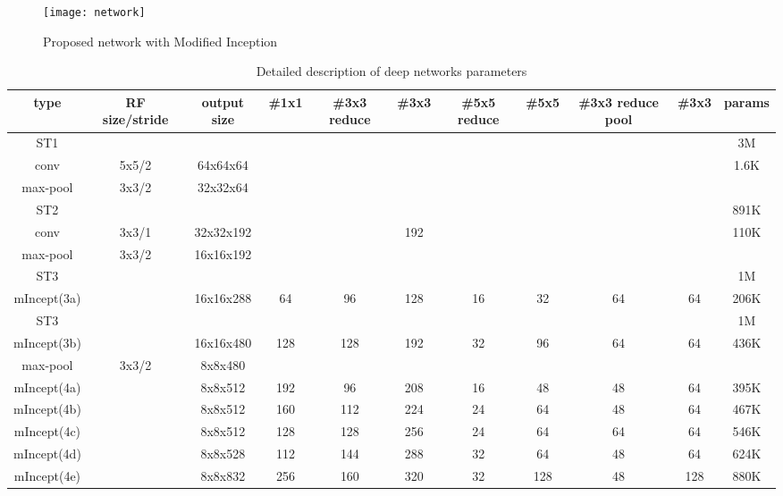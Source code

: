 \documentclass[conference]{IEEEtran}
\begin{document}
\begin{figure*}
  \centering
      \texttt{[image: network]}
\caption{Proposed network with Modified Inception}
\label{fig:network}
\end{figure*}












\begin{table*}[t]
\caption{Detailed description of deep networks parameters}
\label{tab:network}
  \centering
  \begin{tabular}{|c|c|c|c|c|c|c|c|c|c|c|}
\hline
 type & RF size/stride & output size & \#1x1 & \#3x3 reduce & \#3x3 & \#5x5 reduce & \#5x5 & \#3x3 reduce pool & \#3x3 & params \\
 \hline
 \hline
 ST1 & & & & & & & & & & 3M \\
 \hline
 conv & 5x5/2 &64x64x64 &  &   &   &   &   &  & & 1.6K \\
 \hline
 max-pool & 3x3/2 & 32x32x64&  &   &   &   &   & &  &  \\
 \hline
 ST2 & & & & & & & & & & 891K\\
 \hline
 conv & 3x3/1 &  32x32x192 &  &    &  192 &   &   &  & & 110K \\
 \hline
 max-pool & 3x3/2 &  16x16x192  &  &   &   &   &   &  & &  \\
 \hline
 ST3 & & & & & & & & & & 1M\\
 \hline
 mIncept(3a) &  &  16x16x288  & 64  & 96  & 128  & 16  & 32  & 64 & 64 & 206K \\
 \hline
 ST3 & & & & & & & & & & 1M\\
 \hline
 mIncept(3b) & &   16x16x480 &  128 & 128  & 192  & 32  & 96  & 64 & 64 & 436K \\
 \hline
 max-pool & 3x3/2 &  8x8x480 &  &   &   &   &   &   & & \\
 \hline
 mIncept(4a) &  &  8x8x512  & 192  & 96  & 208  & 16  & 48  & 48 & 64 & 395K \\
 \hline
 mIncept(4b) &  &    8x8x512 & 160 & 112  & 224  & 24  & 64  & 48 & 64 & 467K \\
 \hline
 mIncept(4c) &  &    8x8x512 & 128 & 128  & 256  & 24  & 64  &  64& 64& 546K \\
 \hline
 mIncept(4d) &  &    8x8x528 & 112 & 144  & 288  & 32  & 64  & 48 & 64 & 624K \\
 \hline
 mIncept(4e) &  &   8x8x832 & 256 & 160  &  320 & 32  & 128  & 48 & 128 & 880K \\

\end{tabular}
\end{table*}
\end{document}
